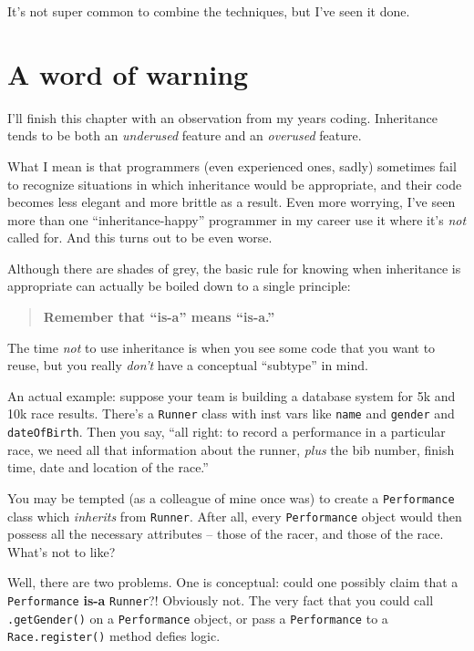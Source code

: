 It's not super common to combine the techniques, but I've seen it done.

\section{A word of warning}

I'll finish this chapter with an observation from my years coding. Inheritance
tends to be both an \textit{underused} feature and an \textit{overused}
feature.

What I mean is that programmers (even experienced ones, sadly) sometimes fail
to recognize situations in which inheritance would be appropriate, and their
code becomes less elegant and more brittle as a result. Even more worrying,
I've seen more than one ``inheritance-happy'' programmer in my career use it
where it's \textit{not} called for. And this turns out to be even worse.

Although there are shades of grey, the basic rule for knowing when inheritance
is appropriate can actually be boiled down to a single principle:

\begin{quote}
\textbf{Remember that ``is-a'' means ``is-a.''}
\end{quote}

The time \textit{not} to use inheritance is when you see some code that you
want to reuse, but you really \textit{don't} have a conceptual ``subtype'' in
mind.

An actual example: suppose your team is building a database system for 5k and
10k race results. There's a \texttt{Runner} class with inst vars like
\texttt{name} and \texttt{gender} and \texttt{dateOfBirth}. Then you say,
``all right: to record a performance in a particular race, we need all that
information about the runner, \textit{plus} the bib number, finish time, date
and location of the race.''

You may be tempted (as a colleague of mine once was) to create a
\texttt{Performance} class which \textit{inherits} from \texttt{Runner}. After
all, every \texttt{Performance} object would then possess all the necessary
attributes -- those of the racer, and those of the race. What's not to like?

Well, there are two problems. One is conceptual: could one possibly claim that
a \texttt{Performance} \textbf{is-a} \texttt{Runner}?! Obviously not. The very
fact that you could call \texttt{.getGender()} on a \texttt{Performance}
object, or pass a \texttt{Performance} to a \texttt{Race.register()}
method defies logic.


